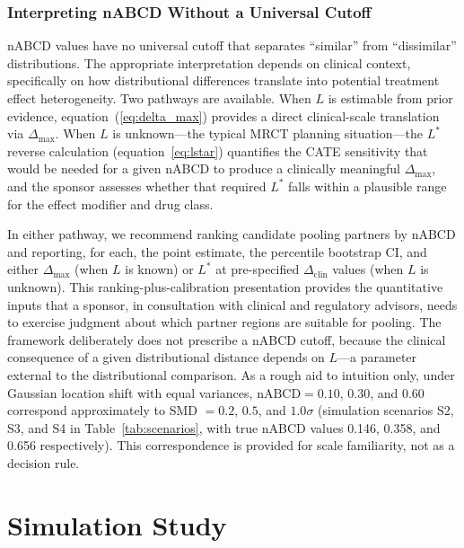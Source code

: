 \documentclass[AMA,Times1COL]{WileyNJDv5}
\begin{document}
\subsubsection{Interpreting nABCD Without a Universal Cutoff}\label{sec:no_cutoff}

nABCD values have no universal cutoff that separates ``similar'' from ``dissimilar'' distributions. The appropriate interpretation depends on clinical context, specifically on how distributional differences translate into potential treatment effect heterogeneity. Two pathways are available. When $L$ is estimable from prior evidence, equation~(\ref{eq:delta_max}) provides a direct clinical-scale translation via $\Delta_{\max}$. When $L$ is unknown---the typical MRCT planning situation---the $L^*$ reverse calculation (equation~\ref{eq:lstar}) quantifies the CATE sensitivity that would be needed for a given nABCD to produce a clinically meaningful $\Delta_{\max}$, and the sponsor assesses whether that required $L^*$ falls within a plausible range for the effect modifier and drug class.

In either pathway, we recommend ranking candidate pooling partners by nABCD and reporting, for each, the point estimate, the percentile bootstrap CI, and either $\Delta_{\max}$ (when $L$ is known) or $L^*$ at pre-specified $\Delta_{\text{clin}}$ values (when $L$ is unknown). This ranking-plus-calibration presentation provides the quantitative inputs that a sponsor, in consultation with clinical and regulatory advisors, needs to exercise judgment about which partner regions are suitable for pooling. The framework deliberately does not prescribe a nABCD cutoff, because the clinical consequence of a given distributional distance depends on $L$---a parameter external to the distributional comparison. As a rough aid to intuition only, under Gaussian location shift with equal variances, $\text{nABCD} = 0.10$, $0.30$, and $0.60$ correspond approximately to SMD $= 0.2$, $0.5$, and $1.0\sigma$ (simulation scenarios S2, S3, and S4 in Table~\ref{tab:scenarios}, with true nABCD values 0.146, 0.358, and 0.656 respectively). This correspondence is provided for scale familiarity, not as a decision rule.

\section{Simulation Study}\label{sec:simulation}
\end{document}
